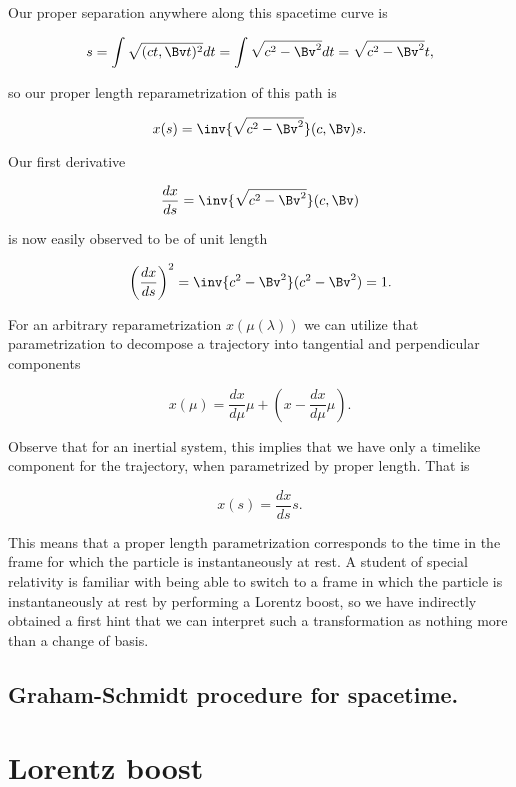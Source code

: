 Our proper separation anywhere along this spacetime curve is

\begin{equation}\label{eqn:grahamSchmidtLorentz:460}
s = \int \sqrt{(c t, \Bv t)^2} dt = \int \sqrt{ c^2 - \Bv^2 } dt = \sqrt{ c^2 - \Bv^2 } t,
\end{equation}

so our proper length reparametrization of this path is

\begin{equation}\label{eqn:grahamSchmidtLorentz:480}
x(s) = \inv{\sqrt{c^2 - \Bv^2}} (c, \Bv) s.
\end{equation}

Our first derivative

\begin{equation}\label{eqn:grahamSchmidtLorentz:500}
\frac{dx}{ds} = \inv{\sqrt{c^2 - \Bv^2}} (c, \Bv) 
\end{equation}

is now easily observed to be of unit length 

\begin{equation}\label{eqn:grahamSchmidtLorentz:520}
\left( \frac{dx}{ds} \right)^2 = \inv{c^2 - \Bv^2} (c^2 - \Bv^2) = 1.
\end{equation}

For an arbitrary reparametrization $x(\mu(\lambda))$ we can utilize that parametrization to decompose a trajectory into tangential and perpendicular components

\begin{equation}\label{eqn:grahamSchmidtLorentz:540}
x(\mu) = \frac{dx}{d\mu} \mu + \left( x - \frac{dx}{d\mu} \mu \right).
\end{equation}

Observe that for an inertial system, this implies that we have only a timelike component for the trajectory, when parametrized by proper length.  That is

\begin{equation}\label{eqn:grahamSchmidtLorentz:n}
x(s) = \frac{dx}{ds} s.
\end{equation}

This means that a proper length parametrization corresponds to the time in the frame for which the particle is instantaneously at rest.  A student of special relativity is familiar with being able to switch to a frame in which the particle is instantaneously at rest by performing a Lorentz boost, so we have indirectly obtained a first hint that we can interpret such a transformation as nothing more than a change of basis.

\subsection{Graham-Schmidt procedure for spacetime.}

\section{Lorentz boost}


\EndArticle
